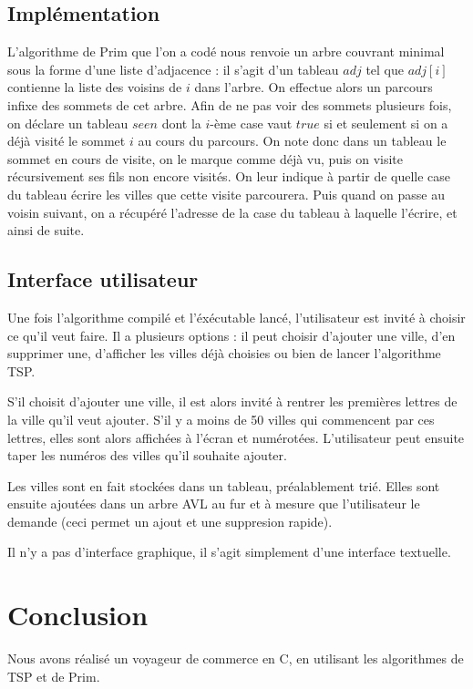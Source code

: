 \documentclass{article}
\begin{document}
\subsection{Implémentation}
L'algorithme de Prim que l'on a codé nous renvoie un arbre couvrant minimal sous la forme d'une liste d'adjacence : il s'agit d'un tableau $adj$ tel que
$adj[i]$ contienne la liste des voisins de $i$ dans l'arbre.
On effectue alors un parcours infixe
des sommets de cet arbre. Afin de ne pas voir des sommets plusieurs fois, on déclare un tableau $seen$ dont la $i$-ème case vaut $true$ si et seulement si on a déjà
visité le sommet $i$ au cours du parcours. On note donc dans un tableau le sommet en cours de visite, on le marque comme déjà vu, puis on visite récursivement ses 
fils non encore visités. On leur indique à partir de quelle case du tableau écrire les villes que cette visite parcourera. Puis quand on passe au voisin suivant, on a
récupéré l'adresse de la case du tableau à laquelle l'écrire, et ainsi de suite.


\subsection{Interface utilisateur}
Une fois l'algorithme compilé et l'éxécutable lancé, l'utilisateur est invité à choisir ce qu'il veut faire.
Il a plusieurs options : il peut choisir d'ajouter une ville, d'en supprimer une, d'afficher les villes déjà choisies ou bien de lancer l'algorithme TSP.

S'il choisit d'ajouter une ville, il est alors invité à rentrer les premières lettres de la ville qu'il veut ajouter. 
S'il y a moins de 50 villes qui commencent par ces lettres, elles sont alors affichées à l'écran et numérotées. L'utilisateur peut ensuite taper les numéros des villes qu'il souhaite ajouter.

Les villes sont en fait stockées dans un tableau, préalablement trié. Elles sont ensuite ajoutées dans un arbre AVL au fur et à mesure que l'utilisateur le demande (ceci permet un ajout et une suppresion rapide).

Il n'y a pas d'interface graphique, il s'agit simplement d'une interface textuelle.

\section*{Conclusion}

Nous avons réalisé un voyageur de commerce en C, en utilisant les algorithmes de TSP et de Prim.



\end{document}
